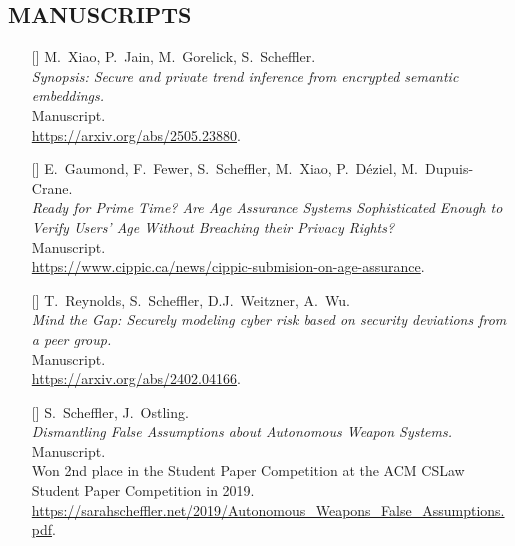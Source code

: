 \documentclass{res}
\begin{document}
\begin{resume}
\section{MANUSCRIPTS}
\vspace{0.25in}

\edef\synopsis{[\arabic{citctr}]}
\edef\ageVerifPrimeTime{[\arabic{citctr}]}
\edef\scramDeviations{[\arabic{citctr}]}
\edef\autonomousWeapons{[\arabic{citctr}]}
\edef\bog{[\arabic{citctr}]}

\begin{itemize}
\item[\synopsis] M.~Xiao, P.~Jain, M.~Gorelick, S.~Scheffler. \\
\emph{Synopsis: Secure and private trend inference from encrypted semantic embeddings.} \\
Manuscript.  \\
\url{https://arxiv.org/abs/2505.23880}.

\item[\ageVerifPrimeTime] E.~Gaumond, F.~Fewer, S.~Scheffler, M.~Xiao, P.~D\'eziel, M.~Dupuis-Crane. \\
\emph{Ready for Prime Time? Are Age Assurance Systems Sophisticated Enough to Verify Users' Age Without Breaching their Privacy Rights?} \\
Manuscript.  \\
\url{https://www.cippic.ca/news/cippic-submision-on-age-assurance}.

\item[\scramDeviations] T.~Reynolds, S.~Scheffler, D.J.~Weitzner, A.~Wu. \\
\emph{Mind the Gap: Securely modeling cyber risk based on security deviations from a peer group.} \\
Manuscript.  \\
\url{https://arxiv.org/abs/2402.04166}.

\item[\autonomousWeapons] S.~Scheffler, J.~Ostling. \\
\emph{Dismantling False Assumptions about Autonomous Weapon Systems.} \\
Manuscript.  \\
Won 2nd place in the Student Paper Competition at the ACM CSLaw Student Paper Competition in 2019. \\
\url{https://sarahscheffler.net/2019/Autonomous_Weapons_False_Assumptions.pdf}.


\end{itemize}
\end{resume}
\end{document}
